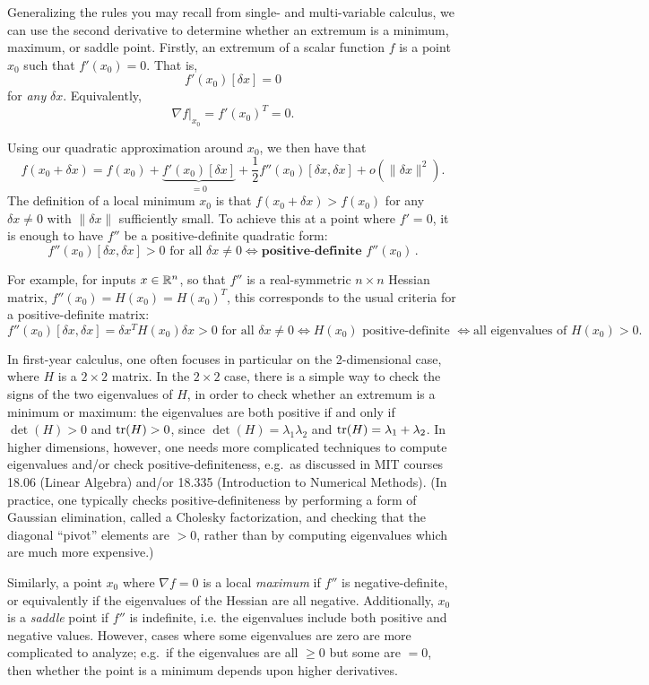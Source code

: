 Generalizing the rules you may recall from single- and multi-variable calculus, we can use the second derivative to determine whether an extremum is a minimum, maximum, or saddle point. Firstly, an extremum of a scalar function $f$ is a point $x_0$  such that $f'(x_0) = 0$. That is, 
\[
f'(x_0) [\delta x] = 0
\] 
for \textit{any} $\delta x$. Equivalently, 
\[
\nabla f \bigr|_{x_0} = f'(x_0)^T = 0.
\]

Using our quadratic approximation around $x_0$, we then have that 
\[
f(x_0 + \delta x) = f(x_0) + \underbrace{f'(x_0) [\delta x]}_{=0} + \frac{1}{2} f''(x_0) [\delta x, \delta x] + o(\lVert \delta x\rVert^2).
\]
The definition of a local minimum $x_0$ is that $f(x_0 + \delta x ) > f(x_0)$ for any $\delta x \neq 0$ with $\lVert \delta x\rVert$ sufficiently small. To achieve this at a point where $f' = 0$, it is enough to have $f''$ be a positive-definite quadratic form:
\[
f''(x_0) [\delta x, \delta x] >0 \text{ for all } \delta x \ne 0 \iff \textbf{positive-definite } f''(x_0) \, .
\]

For example, for inputs $x\in \mathbb R^n$, so that $f''$ is a real-symmetric $n \times n$ Hessian matrix, $f''(x_0) = H(x_0) = H(x_0)^T$, this corresponds to the usual criteria for a positive-definite matrix: 
\[
f''(x_0) [\delta x, \delta x] = \delta x^T H(x_0) \delta x >0 \text{ for all } \delta x \ne 0 \iff H(x_0) \text{ positive-definite } \iff \text{all eigenvalues of } H(x_0) > 0.
\]

In first-year calculus, one often focuses in particular on the 2-dimensional case, where $H$ is a $2\times 2$ matrix.  In the $2\times 2$ case, there is a simple way to check the signs of the two eigenvalues of $H$, in order to check whether an extremum is a minimum or maximum: the eigenvalues are both positive if and only if $\det (H) >0$ and $\operatorname{tr}(H)  >0$, since $\det (H) = \lambda_1 \lambda_2$ and $\operatorname{tr}(H) = \lambda_1 + \lambda_2$. In higher dimensions, however, one needs more complicated techniques to compute eigenvalues and/or check positive-definiteness, e.g.~as discussed in MIT courses 18.06 (Linear Algebra) and/or 18.335 (Introduction to Numerical Methods).  (In practice, one typically checks positive-definiteness by performing a form of Gaussian elimination, called a Cholesky factorization, and checking that the diagonal ``pivot'' elements are $> 0$, rather than by computing eigenvalues which are much more expensive.)

Similarly, a point $x_0$ where $\nabla f = 0$ is a local \emph{maximum}
 if $f''$ is negative-definite, or equivalently if the eigenvalues of the Hessian are all negative. Additionally, $x_0$ is a \emph{saddle} point if $f''$ is indefinite, i.e. the eigenvalues include both positive and negative values. However, cases where some eigenvalues are zero are more complicated to analyze; e.g.~if the eigenvalues are all $\ge 0$ but some are $=0$, then whether the point is a minimum depends upon higher derivatives.

